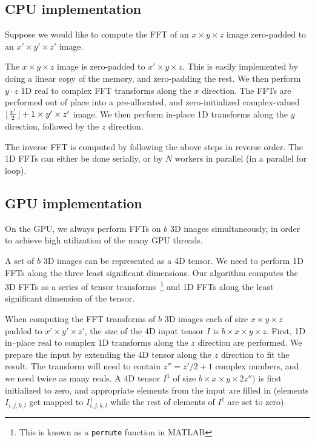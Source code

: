\documentclass[conference]{./IEEEtran/IEEEtran}
\DeclarePairedDelimiter{\floor}{\lfloor}{\rfloor}
\begin{document}
\subsection{CPU implementation}
  Suppose we would like to compute the FFT of an $x \times y \times z$
  image zero-padded to an $x' \times y' \times z'$ image.

  The $x \times y \times z$ image is zero-padded to $x' \times
  y \times z$.  This is easily implemented by doing a linear copy of
  the memory, and zero-padding the rest. We then perform $y \cdot z$
  1D real to complex FFT transforms along the $x$ direction.  The FFTs
  are performed out of place into a pre-allocated, and
  zero-initialized complex-valued $\floor{\frac{x'}{2}} + 1 \times
  y' \times z'$ image.  We then perform in-place 1D transforms along
  the $y$ direction, followed by the $z$ direction.

  The inverse FFT is computed by following the above steps in reverse
  order.  The 1D FFTs can either be done serially, or by $N$ workers
  in parallel (in a parallel for loop).


\subsection{GPU implementation}

\label{sec:gpu-fft-impl}

  On the GPU, we always perform FFTs on $b$ 3D images
  simultaneously, in order to achieve high utilization of the many
  GPU threads.

  A set of $b$ 3D images can be represented as a 4D tensor.  We need
  to perform 1D FFTs along the three least significant dimensions.
  Our algorithm computes the 3D FFTs as a series of tensor
  transforms~\footnote{This is known as a \texttt{permute} function in
    MATLAB} and 1D FFTs along the least significant dimension of the
  tensor.

  When computing the FFT transforms of $b$ 3D images each of size $x
  \times y \times z$ padded to $x' \times y' \times z'$, the size of
  the 4D input tensor $I$ is $b \times x \times y \times z$.  First,
  1D in--place real to complex 1D transforms along the $z$ direction
  are performed. We prepare the input by extending the 4D tensor along
  the $z$ direction to fit the result.  The transform will need to
  contain $z'' = z' / 2 + 1$ complex numbers, and we need twice as
  many reals.  A 4D tensor $I^1$ of size $b \times x \times y \times
  2z'')$ is first initialized to zero, and appropriate elements from
  the input are filled in (elements $I_{i,j,k,l}$ get mapped to
  $I^1_{i,j,k,l}$ while the rest of elements of $I^1$ are set to
  zero).
\end{document}
